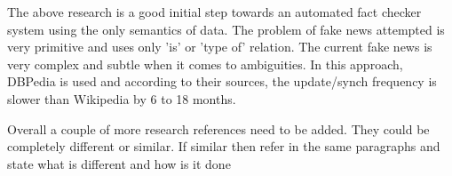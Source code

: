 \documentclass[a4paper, 11pt]{article}
\begin{document}
The above research is a good initial step towards an automated fact checker system using the only semantics of data. The problem of fake news attempted is very primitive and uses only 'is' or 'type of' relation. The current fake news is very complex and subtle when it comes to ambiguities. In this approach, DBPedia is used and according to their sources, the update/synch frequency is slower than Wikipedia by 6 to 18 months.

\color{red}
Overall a couple of more research references need to be added. They could be completely different or similar. If similar then refer in the same paragraphs and state what is different and how is it done
\color{black}







  



\end{document}

